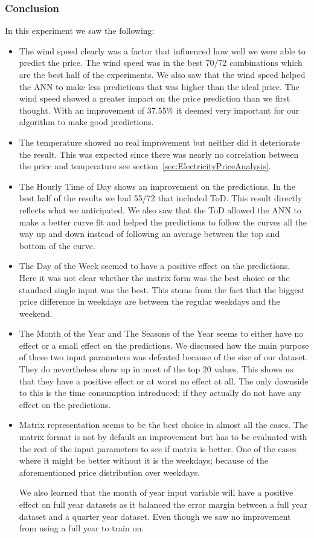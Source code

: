 \subsubsection{Conclusion}
In this experiment we saw the following:
\begin{itemize}
	\item The wind speed clearly was a factor that influenced how well we were able to predict the price. The wind speed was in the best 70/72 combinations which are the best half of the experiments. We also saw that the wind speed helped the ANN to make less predictions that was higher than the ideal price. The wind speed showed a greater impact on the price prediction than we first thought. With an improvement of 37.55\% it deemed very important for our algorithm to make good predictions.
	\item The temperature showed no real improvement but neither did it deteriorate the result. This was expected since there was nearly no correlation between the price and temperature see section~\ref{sec:ElectricityPriceAnalysis}.
	\item The Hourly Time of Day shows an improvement on the predictions. In the best half of the results we had 55/72 that included ToD. This result directly reflects what we anticipated. We also saw that the ToD allowed the ANN to make a better curve fit and helped the predictions to follow the curves all the way up and down instead of following an average between the top and bottom of the curve.
	\item The Day of the Week seemed to have a positive effect on the predictions. Here it was not clear whether the matrix form was the best choice or the standard single input was the best. This stems from the fact that the biggest price difference in weekdays are between the regular weekdays and the weekend.
	\item The Month of the Year and The Seasons of the Year seems to either have no effect or a small effect on the predictions. We discussed how the main purpose of these two input parameters was defeated because of the size of our dataset. They do nevertheless show up in most of the top 20 values. This shows us that they have a positive effect or at worst no effect at all. The only downside to this is the time consumption introduced; if they actually do not have any effect on the predictions.
	\item Matrix representation seems to be the best choice in almost all the cases. The matrix format is not by default an improvement but has to be evaluated with the rest of the input parameters to see if matrix is better. One of the cases where it might be better without it is the weekdays; because of the aforementioned price distribution over weekdays.

We also learned that the month of year input variable will have a positive effect on full year datasets as it balanced the error margin between a full year dataset and a quarter year dataset. Even though we saw no improvement from using a full year to train on.
\end{itemize}

